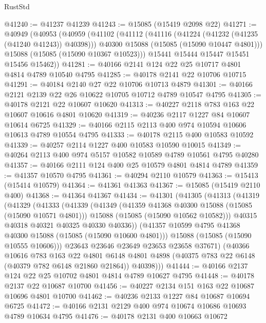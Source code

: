 \begin{lexlean}{RustStd}
\begin{coremodule}
@41240 := @41237 @41239
@41243 := @15085 (@15419 @2098 @22)
@41271 := @40949
    (@40953
      (@40959
        (@41102
          (@41112
            (@41116 (@41224 (@41232 (@41235 (@41240 @41243)) @40398)))
            @40300
            @15088
            (@15085 (@15090 @10447 @4801)))
          @15088
          (@15085 (@15090 @10367 @10523)))
        @15441
        @15444
        @15447
        @15451
        @15456
        @15462))
@41281 := @40166 @2141 @124 @22 @25 @10717 @4801 @4814 @4789 @10540 @4795
@41285 := @40178 @2141 @22 @10706 @10715
@41291 := @40184 @2140 @27 @22 @10706 @10713 @4879
@41301 := @40166 @2121 @2139 @22 @26 @10622 @10705 @10712 @4789 @10547 @4795
@41305 := @40178 @2121 @22 @10607 @10620
@41313 := @40227 @2118 @783 @163 @22 @10607 @10616 @4801 @10620
@41319 := @40236 @2117 @1227 @84 @10607 @10614 @6725
@41329 := @40166 @2115 @2113 @400 @974 @10594 @10606 @10613 @4789 @10554 @4795
@41333 := @40178 @2115 @400 @10583 @10592
@41339 := @40257 @2114 @1227 @400 @10583 @10590 @10015
@41349 := @40264 @2113 @400 @974 @5157 @10582 @10589 @4789 @10561 @4795 @40280
@41357 := @40166 @2111 @124 @400 @25 @10579 @4801 @4814 @4789
@41359 := @41357 @10570 @4795
@41361 := @40294 @2110 @10579
@41363 := @15413 (@15414 @10579)
@41364 := @41361 @41363
@41367 := @15085 (@15419 @2110 @400)
@41368 := @41364 @41367
@41434 := @41301
    (@41305
      (@41313
        (@41319
          (@41329
            (@41333
              (@41339
                (@41349
                  (@41359 @41368 @40300 @15088 (@15085 (@15090 @10571 @4801)))
                  @15088
                  (@15085 (@15090 @10562 @10582)))
                @40315
                @40318
                @40321
                @40325
                @40330
                @40336))
            (@41357 @10599 @4795 @41368 @40300 @15088 (@15085 (@15090 @10600 @4801)))
            @15088
            (@15085 (@15090 @10555 @10606)))
          @23643
          @23646
          @23649
          @23653
          @23658
          @37671)
        (@40366
          @10616
          @783
          @163
          @22
          @4801
          @6148
          @4801
          @4898
          (@40375 @783 @22 @6148 (@40379 @782 @6148 @21860 @21864))
          @40398)))
@41444 := @40166 @2137 @124 @22 @25 @10702 @4801 @4814 @4789 @10627 @4795
@41448 := @40178 @2137 @22 @10687 @10700
@41456 := @40227 @2134 @151 @163 @22 @10687 @10696 @4801 @10700
@41462 := @40236 @2133 @1227 @84 @10687 @10694 @6725
@41472 := @40166 @2131 @2129 @400 @974 @10674 @10686 @10693 @4789 @10634 @4795
@41476 := @40178 @2131 @400 @10663 @10672

\end{coremodule}
\end{lexlean}
